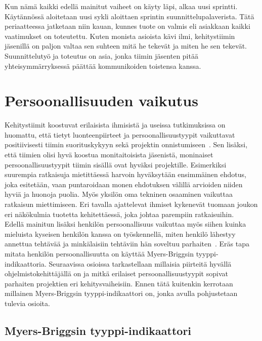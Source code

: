 \documentclass[finnish]{../tktltiki2}
\theoremstyle{definition}
\theoremstyle{remark}
\begin{document}
Kun nämä kaikki edellä mainitut vaiheet on käyty läpi, alkaa uusi
sprintti. Käytännössä aloitetaan uusi sykli aloittaen
sprintin suunnittelupalaverista. Tätä periaatteessa jatketaan
niin kauan, kunnes tuote on valmis eli asiakkaan kaikki vaatimukset
on toteutettu. Kuten monista asioista kävi ilmi, kehitystiimin jäsenillä on paljon valtaa sen suhteen mitä he tekevät ja miten he
sen tekevät. Suunnittelutyö ja toteutus on asia, jonka tiimin
jäsenten pitää yhteisymmärryksessä päättää kommunikoiden toistensa kanssa.

\section{Persoonallisuuden vaikutus}

Kehitystiimit koostuvat erilaisista ihmisistä ja useissa tutkimuksissa on huomattu, että tietyt
luonteenpiirteet ja persoonallisuustyypit vaikuttavat positiivisesti tiimin suorituskykyyn sekä
projektin onnistumiseen~\cite{Acuna:2008:ESP:1414004.1414056,Gorla:2004:WWB:990680.990684,Capretz:2003:PTS:766407.766410,Capretz:2010:MSS:1726559.1726574}. Sen lisäksi, että tiimien olisi hyvä koostua monitaitoisista
jäsenistä, moninaiset persoonallisuustyypit tiimin sisällä ovat hyväksi
projektille. Esimerkiksi suurempia ratkaisuja mietittäessä harvoin hyväksytään
ensimmäinen ehdotus, joka esitetään, vaan puntaroidaan monen ehdotuksen
välillä arvioiden niiden hyviä ja huonoja puolia. Myös yksilön oma
tekninen osaaminen vaikuttaa ratkaisun miettimiseen. Eri tavalla ajattelevat ihmiset kykenevät tuomaan joukon
eri näkökulmia tuotetta kehitettäessä, joka johtaa parempiin ratkaisuihin.\\

Edellä mainitun lisäksi henkilön persoonallisuus vaikuttaa myös
siihen
kuinka mieluista kyseisen henkilön kanssa on työskennellä,
miten henkilö lähestyy annettua tehtävää ja minkälaisiin tehtäviin
hän soveltuu parhaiten~\cite{Begel:2008:PPW:1414004.1414026,Capretz:2010:MSS:1726559.1726574}. Eräs tapa mitata henkilön persoonallisuutta on käyttää Myers-Briggsin tyyppi-indikaattoria.
Seuraavissa osioissa
 tarkastellaan millaisia piirteitä hyvällä
ohjelmistokehittäjällä on ja mitkä erilaiset persoonallisuustyypit
sopivat parhaiten projektien eri kehitysvaiheisiin. Ennen tätä kuitenkin kerrotaan millainen Myers-Briggsin tyyppi-indikaattori on, jonka avulla pohjustetaan tulevia osioita.

\subsection{Myers-Briggsin tyyppi-indikaattori}
\end{document}
